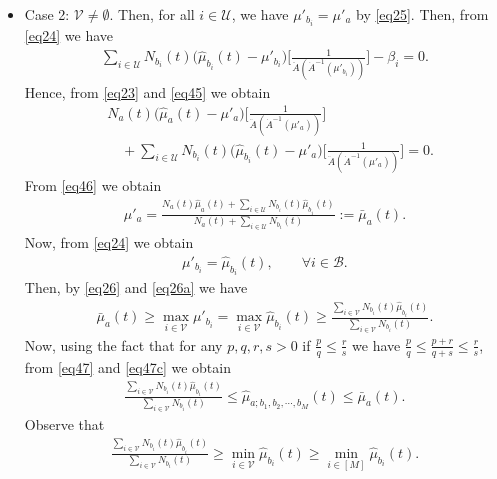 \documentclass[final]{IEEEtran}
\newcommand{\nn}{\nonumber}
\newcommand{\calB}{\mathcal{B}}
\newcommand{\calU}{\mathcal{U}}
\newcommand{\calV}{\mathcal{V}}
\begin{document}
\begin{itemize}
\begin{align}
&Z_{a;b_1,b_2,\cdots,b_M}(t)=N_a(t)d(\hat{\mu}_a(t),\hat{\mu}_{a;b_1,b_2,\cdots,b_M}(t))\nn\\
&\quad +\sum_{i=1}^M N_{b_i}(t) d(\hat{\mu}_{b_i}(t),\hat{\mu}_{a;b_1,b_2,\cdots,b_M}(t)) \label{eqktm}.
\end{align}
\item Case 2: $\calV \neq \emptyset$. Then, for all $i \in \calU$, we have $\mu'_{b_i}= \mu'_a$ by \eqref{eq25}. Then, from \eqref{eq24} we have
\begin{align}
\sum_{i \in \calU} N_{b_i}(t)\big(\hat{\mu}_{b_i}(t)-\mu'_{b_i}\big)\bigg[\frac{1}{\ddot{A}(\dot{A}^{-1}(\mu'_{b_i}))}\bigg]-\beta_i=0 \label{eq45}.
\end{align}
Hence, from \eqref{eq23} and \eqref{eq45} we obtain
\begin{align}
&N_a(t)\big(\hat{\mu}_a(t)-\mu'_a\big)\bigg[\frac{1}{\ddot{A}(\dot{A}^{-1}(\mu'_a))}\bigg]\nn\\
&\quad + \sum_{i \in \calU} N_{b_i}(t)\big(\hat{\mu}_{b_i}(t)-\mu'_a \big)\bigg[\frac{1}{\ddot{A}(\dot{A}^{-1}(\mu'_a))}\bigg]=0 \label{eq46}.
\end{align}
From \eqref{eq46} we obtain
\begin{align}
\mu'_a=\frac{N_a(t) \hat{\mu}_a(t)+\sum_{i \in \calU}  N_{b_i}(t) \hat{\mu}_{b_i}(t)}{N_a(t)+\sum_{i \in \calU}  N_{b_i}(t)  }:=\bar{\mu}_a(t) \label{eq47}. 
\end{align}
Now, from \eqref{eq24} we obtain
\begin{align}
\mu'_{b_i}= \hat{\mu}_{b_i}(t), \qquad \forall i \in \calB \label{eq26a}.
\end{align}
Then, by \eqref{eq26} and \eqref{eq26a} we have
\begin{align}
\bar{\mu}_a(t) \geq \max_{i \in \calV} \mu'_{b_i}= \max_{i \in \calV}  \hat{\mu}_{b_i}(t) \geq \frac{\sum_{i\in \calV} N_{b_i}(t) \hat{\mu}_{b_i}(t)}{\sum_{i \in \calV} N_{b_i}(t)} \label{eq47c}. 
\end{align}
Now, using the fact that for any $p,q,r,s>0$ if $\frac{p}{q}\leq \frac{r}{s}$ we have $\frac{p}{q} \leq \frac{p+r}{q+s} \leq \frac{r}{s}$, from \eqref{eq47} and \eqref{eq47c} we obtain
\begin{align}
 \frac{\sum_{i\in \calV} N_{b_i}(t) \hat{\mu}_{b_i}(t)}{\sum_{i \in \calV} N_{b_i}(t)}\leq \hat{\mu}_{a;b_1,b_2,\cdots, b_M}(t) \leq \bar{\mu}_a(t) \label{aq10}. 
\end{align}
Observe that
\begin{align}
\frac{\sum_{i\in \calV} N_{b_i}(t) \hat{\mu}_{b_i}(t)}{\sum_{i \in \calV} N_{b_i}(t)}\geq \min_{i \in \calV} \hat{\mu}_{b_i}(t)\geq \min_{i \in [M]} \hat{\mu}_{b_i}(t) \label{aq11}. 

\end{align}
\end{itemize}
\end{document}
